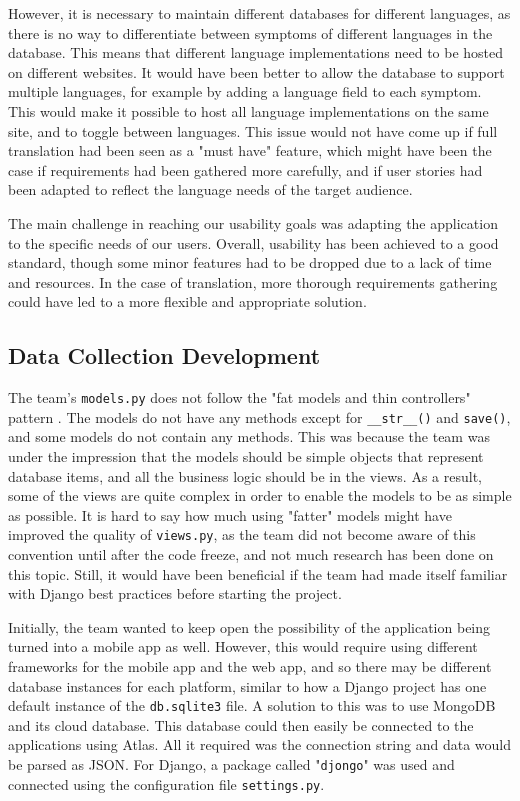 \documentclass{l3proj}
\begin{document}
However, it is necessary to maintain different databases for different languages, as there is no way to differentiate between symptoms of different languages in the database. This means that different language implementations need to be hosted on different websites. It would have been better to allow the database to support multiple languages, for example by adding a language field to each symptom. This would make it possible to host all language implementations on the same site, and to toggle between languages. This issue would not have come up if full translation had been seen as a "must have" feature, which might have been the case if requirements had been gathered more carefully, and if user stories had been adapted to reflect the language needs of the target audience.

The main challenge in reaching our usability goals was adapting the application to the specific needs of our users. Overall, usability has been achieved to a good standard, though some minor features had to be dropped due to a lack of time and resources. In the case of translation, more thorough requirements gathering could have led to a more flexible and appropriate solution.

\subsection{Data Collection Development}
The team's \texttt{models.py} does not follow the "fat models and thin controllers" pattern \cite{BestPractices}. The models do not have any methods except for \texttt{\_\_str\_\_()} and \texttt{save()}, and some models do not contain any methods. This was because the team was under the impression that the models should be simple objects that represent database items, and all the business logic should be in the views. As a result, some of the views are quite complex in order to enable the models to be as simple as possible.  It is hard to say how much using "fatter" models might have improved the quality of \texttt{views.py}, as the team did not become aware of this convention until after the code freeze, and not much research has been done on this topic. Still, it would have been beneficial if the team had made itself familiar with Django best practices before starting the project.

Initially, the team wanted to keep open the possibility of the application being turned into a mobile app as well. However, this would require using different frameworks for the mobile app and the web app, and so there may be different database instances for each platform, similar to how a Django project has one default instance of the \texttt{db.sqlite3} file. A solution to this was to use MongoDB and its cloud database. This database could then easily be connected to the applications using Atlas. All it required was the connection string and data would be parsed as JSON. For Django, a package called "\texttt{djongo}" was used and connected using the configuration file \texttt{settings.py}. 
\end{document}
